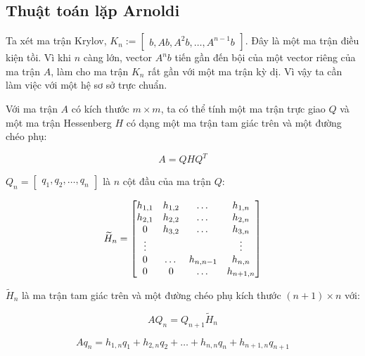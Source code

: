 \documentclass[14pt, a4paper]{article}
\numberwithin{equation}{section}
\numberwithin{algorithm}{section}
\numberwithin{figure}{section}
\numberwithin{dl}{section}
\numberwithin{md}{section}
\numberwithin{bd}{section}
\numberwithin{dn}{section}
\numberwithin{hq}{section}
\begin{document}
\subsection{Thuật toán lặp Arnoldi}

Ta xét ma trận Krylov, $K_n := \begin{bmatrix} b, Ab, A^2b, \dots, A^{n-1}b \end{bmatrix}$. Đây là một ma trận điều kiện tồi. Vì khi $n$ càng lớn, vector $A^nb$ tiến gần đến bội của một vector riêng của ma trận $A$, làm cho ma trận $K_n$ rất gần với một ma trận kỳ dị. Vì vậy ta cần làm việc với một hệ sơ sở trực chuẩn.

Với ma trận $A$ có kích thước $m \times m$, ta có thể tính một ma trận trực giao $Q$ và một ma trận Hessenberg $H$ có dạng một ma trận tam giác trên và một đường chéo phụ:

\begin{equation} \label{eq:AQHQ}
    A = QHQ^T
\end{equation}

$Q_n=\begin{bmatrix} q_1, q_2, \dots, q_n \end{bmatrix}$ là $n$ cột đầu của ma trận $Q$:

\begin{equation} \label{eq:Hessenberg_matrix}
    \widetilde{H}_n = \begin{bmatrix} h_{1,1} & h_{1, 2} & \dots & h_{1, n} \\
    h_{2, 1} & h_{2, 2} & \dots & h_{2, n} \\
    0 & h_{3, 2} & \dots  & h_{3, n} \\
    \vdots & \space & \space & \vdots \\
    0 & \dots & h_{n, n-1} & h_{n, n} \\
    0 & 0 & \dots & h_{n+1, n}\end{bmatrix}
\end{equation}

$\widetilde{H}_n$ là ma trận tam giác trên và một đường chéo phụ kích thước $(n+1)\times n$ với:

\begin{equation} \label{eq:A_projection}
    AQ_n = Q_{n+1}\widetilde{H}_n
\end{equation}

\begin{equation} \label{eq:recurrence_term}
    Aq_n = h_{1, n}q_1 + h_{2, n}q_2 + \dots + h_{n, n}q_n + h_{n+1, n}q_{n+1}
\end{equation}
\end{document}
